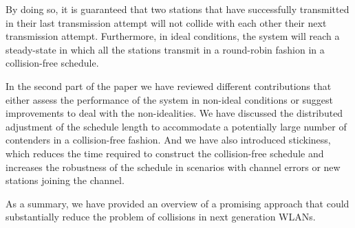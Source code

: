 \documentclass[journal]{IEEEtran}
\begin{document}
By doing so, it is guaranteed that two stations that have successfully transmitted in their last transmission attempt will not collide with each other their next transmission attempt.
Furthermore, in ideal conditions, the system will reach a steady-state in which all the stations transmit in a round-robin fashion in a collision-free schedule.

In the second part of the paper we have reviewed different contributions that either assess the performance of the system in non-ideal conditions or suggest improvements to deal with the non-idealities.
We have discussed the distributed adjustment of the schedule length to accommodate a potentially large number of contenders in a collision-free fashion.
And we have also introduced stickiness, which reduces the time required to construct the collision-free schedule and increases the robustness of the schedule in scenarios with channel errors or new stations joining the channel.

As a summary, we have provided an overview of a promising approach that could substantially reduce the problem of collisions in next generation WLANs.



%
%

\end{document}
